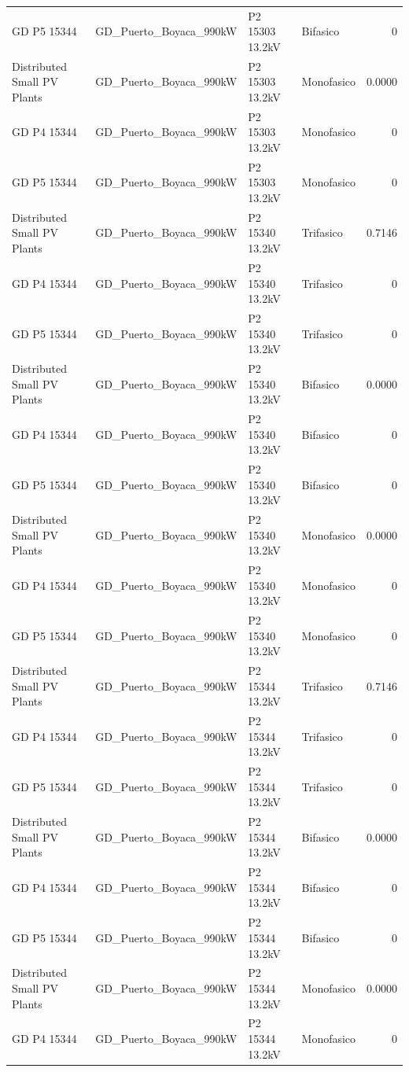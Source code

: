 \documentclass[11pt,a4paper]{article}
\begin{document}
\begin{longtable}{llllr}
GD P5 15344 & GD\_Puerto\_Boyaca\_990kW & P2 15303 13.2kV & Bifasico & 0 \\
Distributed Small PV Plants & GD\_Puerto\_Boyaca\_990kW & P2 15303 13.2kV & Monofasico & 0.0000 \\
GD P4 15344 & GD\_Puerto\_Boyaca\_990kW & P2 15303 13.2kV & Monofasico & 0 \\
GD P5 15344 & GD\_Puerto\_Boyaca\_990kW & P2 15303 13.2kV & Monofasico & 0 \\
Distributed Small PV Plants & GD\_Puerto\_Boyaca\_990kW & P2 15340 13.2kV & Trifasico & 0.7146 \\
GD P4 15344 & GD\_Puerto\_Boyaca\_990kW & P2 15340 13.2kV & Trifasico & 0 \\
GD P5 15344 & GD\_Puerto\_Boyaca\_990kW & P2 15340 13.2kV & Trifasico & 0 \\
Distributed Small PV Plants & GD\_Puerto\_Boyaca\_990kW & P2 15340 13.2kV & Bifasico & 0.0000 \\
GD P4 15344 & GD\_Puerto\_Boyaca\_990kW & P2 15340 13.2kV & Bifasico & 0 \\
GD P5 15344 & GD\_Puerto\_Boyaca\_990kW & P2 15340 13.2kV & Bifasico & 0 \\
Distributed Small PV Plants & GD\_Puerto\_Boyaca\_990kW & P2 15340 13.2kV & Monofasico & 0.0000 \\
GD P4 15344 & GD\_Puerto\_Boyaca\_990kW & P2 15340 13.2kV & Monofasico & 0 \\
GD P5 15344 & GD\_Puerto\_Boyaca\_990kW & P2 15340 13.2kV & Monofasico & 0 \\
Distributed Small PV Plants & GD\_Puerto\_Boyaca\_990kW & P2 15344 13.2kV & Trifasico & 0.7146 \\
GD P4 15344 & GD\_Puerto\_Boyaca\_990kW & P2 15344 13.2kV & Trifasico & 0 \\
GD P5 15344 & GD\_Puerto\_Boyaca\_990kW & P2 15344 13.2kV & Trifasico & 0 \\
Distributed Small PV Plants & GD\_Puerto\_Boyaca\_990kW & P2 15344 13.2kV & Bifasico & 0.0000 \\
GD P4 15344 & GD\_Puerto\_Boyaca\_990kW & P2 15344 13.2kV & Bifasico & 0 \\
GD P5 15344 & GD\_Puerto\_Boyaca\_990kW & P2 15344 13.2kV & Bifasico & 0 \\
Distributed Small PV Plants & GD\_Puerto\_Boyaca\_990kW & P2 15344 13.2kV & Monofasico & 0.0000 \\
GD P4 15344 & GD\_Puerto\_Boyaca\_990kW & P2 15344 13.2kV & Monofasico & 0 \\

\end{longtable}
\end{document}
